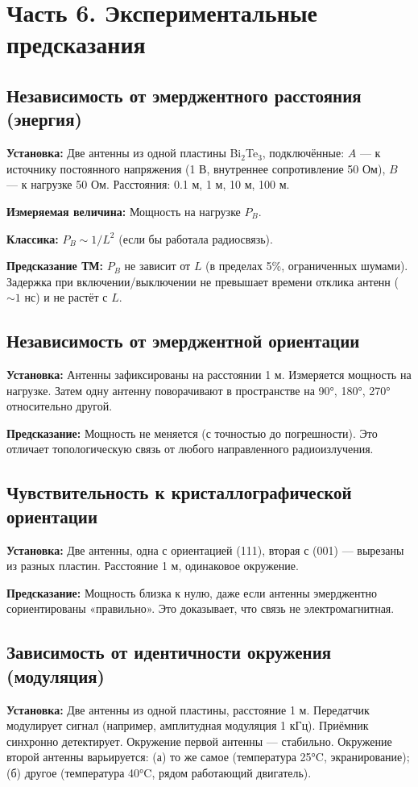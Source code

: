 \documentclass[a4paper,12pt]{article}
\begin{document}
\section*{Часть 6. Экспериментальные предсказания}

\subsection{Независимость от эмерджентного расстояния (энергия)}
\textbf{Установка:} Две антенны из одной пластины Bi\(_2\)Te\(_3\), подключённые: \(A\) — к источнику постоянного напряжения (1 В, внутреннее сопротивление 50 Ом), \(B\) — к нагрузке 50 Ом. Расстояния: 0.1 м, 1 м, 10 м, 100 м.

\textbf{Измеряемая величина:} Мощность на нагрузке \(P_B\).

\textbf{Классика:} \(P_B \sim 1/L^2\) (если бы работала радиосвязь).

\textbf{Предсказание ТМ:} \(P_B\) не зависит от \(L\) (в пределах 5\%, ограниченных шумами). Задержка при включении/выключении не превышает времени отклика антенн (\(\sim 1\) нс) и не растёт с \(L\).

\subsection{Независимость от эмерджентной ориентации}
\textbf{Установка:} Антенны зафиксированы на расстоянии 1 м. Измеряется мощность на нагрузке. Затем одну антенну поворачивают в пространстве на 90°, 180°, 270° относительно другой.

\textbf{Предсказание:} Мощность не меняется (с точностью до погрешности). Это отличает топологическую связь от любого направленного радиоизлучения.

\subsection{Чувствительность к кристаллографической ориентации}
\textbf{Установка:} Две антенны, одна с ориентацией (111), вторая с (001) — вырезаны из разных пластин. Расстояние 1 м, одинаковое окружение.

\textbf{Предсказание:} Мощность близка к нулю, даже если антенны эмерджентно сориентированы «правильно». Это доказывает, что связь не электромагнитная.

\subsection{Зависимость от идентичности окружения (модуляция)}
\textbf{Установка:} Две антенны из одной пластины, расстояние 1 м. Передатчик модулирует сигнал (например, амплитудная модуляция 1 кГц). Приёмник синхронно детектирует. Окружение первой антенны — стабильно. Окружение второй антенны варьируется: (а) то же самое (температура 25°C, экранирование); (б) другое (температура 40°C, рядом работающий двигатель).
\end{document}
